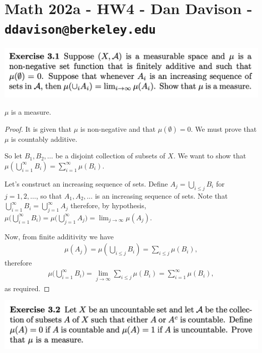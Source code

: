 \section*{Math 202a - HW4 - Dan Davison - \texttt{ddavison@berkeley.edu}}

\begin{mdframed}
\includegraphics[width=400pt]{img/analysis--berkeley-202a-hw-1e56.png}
\end{mdframed}
\begin{claim*}
  $\mu$ is a measure.
\end{claim*}
\begin{proof}
  It is given that $\mu$ is non-negative and that $\mu(\emptyset) = 0$. We must prove that $\mu$ is countably
  additive.

  So let $B_1, B_2, \dots$ be a disjoint collection of subsets of $X$. We want to show
  that $\mu(\bigcup_{i=1}^\infty B_i) = \sum_{i=1}^\infty \mu(B_i)$.

  Let's construct an increasing sequence of sets. Define $A_j = \bigcup_{i \leq j} B_i$ for $j=1, 2, \dots$, so
  that $A_1, A_2, \dots$ is an increasing sequence of sets. Note
  that $\bigcup_{i=1}^\infty B_i = \bigcup_{j=1}^\infty A_j$ therefore, by
  hypothesis,
  $\mu\big(\bigcup_{i=1}^\infty B_i\big) = \mu\big(\bigcup_{j=1}^\infty A_j\big) = \lim_{j\to\infty} \mu(A_j)$.

  Now, from finite additivity we have
  \begin{align*}
    \mu(A_j) = \mu(\bigcup_{i \leq j} B_i) = \sum_{i\leq j} \mu(B_i),
  \end{align*}
  therefore
  \begin{align*}
    \mu\big(\bigcup_{i=1}^\infty B_i\big) = \lim_{j\to\infty} \sum_{i\leq j} \mu(B_i) = \sum_{i=1}^\infty \mu(B_i),
  \end{align*}
  as required.
\end{proof}

\newpage
\begin{mdframed}
\includegraphics[width=400pt]{img/analysis--berkeley-202a-hw-8824.png}
\end{mdframed}

